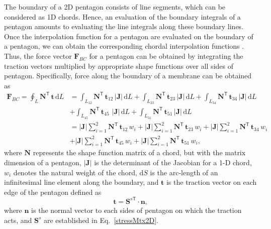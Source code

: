 The boundary of a 2D pentagon consists of line segments, which can be considered as 1D chords. Hence, an evaluation of the boundary integrals of a pentagon amounts to evaluating the line integrals along these boundary lines.  Once the interpolation function for a pentagon are evaluated on the boundary of a pentagon, we can obtain the corresponding chordal interpolation functions \cite{Reddy93}.  Thus, the force vector $\mathbf{F}_{BC}$ for a pentagon can be obtained by integrating the traction vectors multiplied by appropriate shape functions over all sides of pentagon.  Specifically, force along the boundary of a membrane can be obtained as
\begin{equation}
\begin{aligned}
\mathbf{F}_{BC}  = \oint_L \mathbf{N}^{\mathsf{T}} \, \mathbf{t} \, \mathrm{d} L & = \int_{L_{12}} \mathbf{N}^{\mathsf{T}} \, \mathbf{t}_{12} \,|\mathbf{J}| \, \mathrm{d} L + \int_{L_{23}} \mathbf{N}^{\mathsf{T}} \, \mathbf{t}_{23} \,|\mathbf{J}| \, \mathrm{d} L + \int_{L_{34}} \mathbf{N}^{\mathsf{T}} \, \mathbf{t}_{34} \,|\mathbf{J}| \, \mathrm{d} L \\
& + \int_{L_{45}} \mathbf{N}^{\mathsf{T}} \, \mathbf{t}_{45} \, \,|\mathbf{J}| \, \mathrm{d} L + \int_{L_{51}} \mathbf{N}^{\mathsf{T}} \, \mathbf{t}_{51} \,|\mathbf{J}| \, \mathrm{d} L \\
& = |\mathbf{J}| \sum_{i=1}^{2} \mathbf{N}^{\mathsf{T}} \, \mathbf{t}_{12}  \, w_i + |\mathbf{J}| \sum_{i=1}^{2} \mathbf{N}^{\mathsf{T}} \, \mathbf{t}_{23}  \, w_i + |\mathbf{J}| \sum_{i=1}^{2} \mathbf{N}^{\mathsf{T}} \, \mathbf{t}_{34} \, w_i \\
& + |\mathbf{J}| \sum_{i=1}^{2} \mathbf{N}^{\mathsf{T}} \, \mathbf{t}_{45} \, w_i + |\mathbf{J}| \sum_{i=1}^{2} \mathbf{N}^{\mathsf{T}} \, \mathbf{t}_{51} \, w_i ,
\end{aligned}
\end{equation}
where $\mathbf{N}$ represents the shape function matrix of a chord, but with the matrix dimension of a pentagon, $|\mathbf{J}|$ is the determinant of the Jacobian for a 1-D chord, $w_i$ denotes the natural weight of the chord, $\mathrm{d} S$ is the arc-length of an infinitesimal line element along the boundary, and $\mathbf{t}$ is the traction vector on each edge of the pentagon defined as
\begin{equation}
\mathbf{t} = \mathbf{S}^{s\mathsf{T}} \cdot \mathbf{n}  ,
\end{equation}
where $ \mathbf{n} $ is the normal vector to each sides of pentagon on which the traction acts, and $\mathbf{S}^s $ are established in Eq.~\ref{stressMtx2D}.

